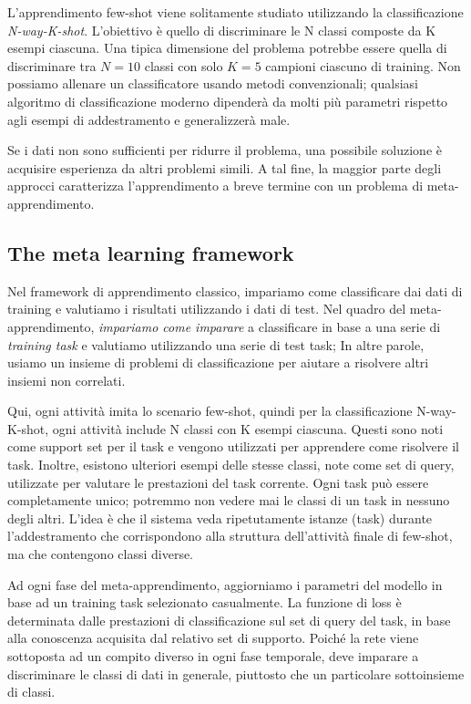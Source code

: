 \documentclass[12pt,a4paper,titlepage]{article}
\begin{document}
L'apprendimento few-shot viene solitamente studiato utilizzando la classificazione \emph{N-way-K-shot}. L'obiettivo è quello di discriminare le N classi composte da K esempi ciascuna. Una tipica dimensione del problema potrebbe essere quella di discriminare tra $N=10$ classi con solo $K=5$ campioni ciascuno di training. Non possiamo allenare un classificatore usando metodi convenzionali; qualsiasi algoritmo di classificazione moderno dipenderà da molti più parametri rispetto agli esempi di addestramento e generalizzerà male.

Se i dati non sono sufficienti per ridurre il problema, una possibile soluzione è acquisire esperienza da altri problemi simili. A tal fine, la maggior parte degli approcci caratterizza l'apprendimento a breve termine con un problema di meta-apprendimento.

\subsection{The meta learning framework}
Nel framework di apprendimento classico, impariamo come classificare dai dati di training e valutiamo i risultati utilizzando i dati di test. Nel quadro del meta-apprendimento, \textit{impariamo come imparare} a classificare in base a una serie di \textit{training task} e valutiamo utilizzando una serie di test task; In altre parole, usiamo un insieme di problemi di classificazione per aiutare a risolvere altri insiemi non correlati.

Qui, ogni attività imita lo scenario few-shot, quindi per la classificazione N-way-K-shot, ogni attività include N classi con K esempi ciascuna. Questi sono noti come support set per il task e vengono utilizzati per apprendere come risolvere il task. Inoltre, esistono ulteriori esempi delle stesse classi, note come set di query, utilizzate per valutare le prestazioni del task corrente. Ogni task può essere completamente unico; potremmo non vedere mai le classi di un task in nessuno degli altri. L'idea è che il sistema veda ripetutamente istanze (task) durante l'addestramento che corrispondono alla struttura dell'attività finale di few-shot, ma che contengono classi diverse.

Ad ogni fase del meta-apprendimento, aggiorniamo i parametri del modello in base ad un training task selezionato casualmente. La funzione di loss è determinata dalle prestazioni di classificazione sul set di query del task, in base alla conoscenza acquisita dal relativo set di supporto. Poiché la rete viene sottoposta ad un compito diverso in ogni fase temporale, deve imparare a discriminare le classi di dati in generale, piuttosto che un particolare sottoinsieme di classi.
\end{document}
